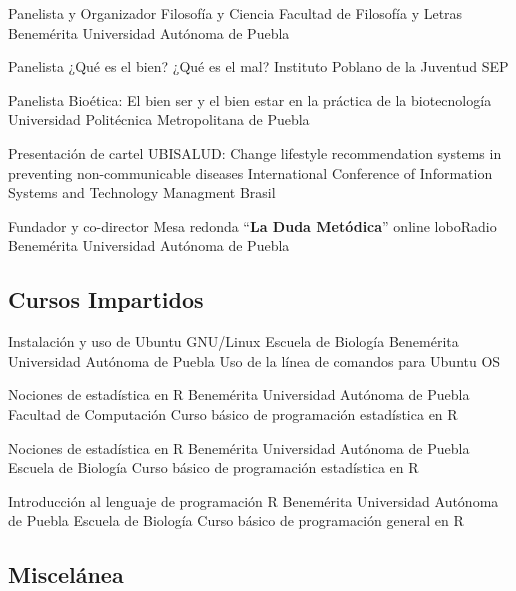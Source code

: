 \documentclass[11pt, letterpaper, roman]{moderncv}
\begin{document}
		{Panelista y Organizador}
		{Filosofía y Ciencia}
		{}
		{\newline Facultad de Filosofía y Letras}
		{Benemérita Universidad Autónoma de Puebla}

		{Panelista}
		{¿Qué es el bien? ¿Qué es el mal?}
		{}
		{\newline Instituto Poblano de la Juventud}
		{SEP}

		{Panelista}
		{Bioética: El bien ser y el bien estar en la práctica de la 
		biotecnología}
		{}
		{}
		{Universidad Politécnica Metropolitana de Puebla}

		{Presentación de cartel}
		{UBISALUD: Change lifestyle recommendation systems in preventing 
		non-communicable diseases}
		{International Conference of Information Systems and Technology 
		Managment}
		{}
		{Brasil}

		{Fundador y co-director}
		{Mesa redonda ``\textbf{La Duda Metódica}'' online}
		{}
		{\newline loboRadio}
		{Benemérita Universidad Autónoma de Puebla}
		
\subsection{Cursos Impartidos}

		{Instalación y uso de Ubuntu GNU/Linux}
		{}
		{Escuela de Biología}
		{Benemérita Universidad Autónoma de Puebla}
		{Uso de la línea de comandos para Ubuntu OS}

		{Nociones de estadística en R}
		{}
		{Benemérita Universidad Autónoma de Puebla}
		{Facultad de Computación}
		{Curso básico de programación estadística en R}

		{Nociones de estadística en R}
		{}
		{Benemérita Universidad Autónoma de Puebla}
		{Escuela de Biología}
		{Curso básico de programación estadística en R}

		{Introducción al lenguaje de programación R}
		{}
		{Benemérita Universidad Autónoma de Puebla}
		{Escuela de Biología}
		{Curso básico de programación general en R}

\subsection{Miscelánea}
\end{document}
